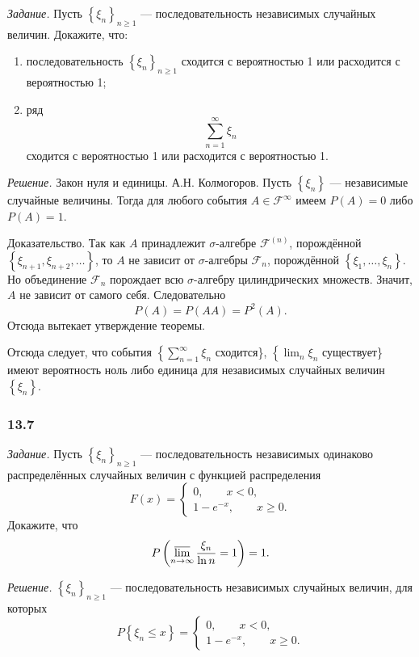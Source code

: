 \textit{Задание.} Пусть $ \left\{ \xi_n \right\}_{n \geq 1}$ --- последовательность независимых случайных величин.
Докажите, что:
\begin{enumerate}[label=\alph*)]
\item последовательность $ \left\{ \xi_n \right\}_{n \geq 1}$ сходится с вероятностью 1 или расходится с вероятностью 1;
\item ряд
$$ \sum \limits_{n=1}^{ \infty } \xi_n$$
сходится с вероятностью 1 или расходится с вероятностью 1.
\end{enumerate}

\textit{Решение.} Закон нуля и единицы.
А.Н. Колмогоров.
Пусть $ \left\{ \xi_n \right\} $ --- независимые случайные величины.
Тогда для любого события $A \in \mathcal{F}^{ \infty }$ имеем $P \left( A \right) = 0$ либо $P \left( A \right) = 1$.

Доказательство.
Так как $A$ принадлежит $ \sigma $-алгебре $ \mathcal{F}^{ \left( n \right) }$,
порождённой $ \left\{ \xi_{n+1}, \xi_{n+2}, \dotsc \right\} $,
то $A$ не зависит от $ \sigma $-алгебры $ \mathcal{F}_n$, порождённой $ \left\{ \xi_1, \dotsc, \xi_n \right\} $.
Но объединение $ \mathcal{F}_n$ порождает всю $ \sigma $-алгебру цилиндрических множеств.
Значит, $A$ не зависит от самого себя.
Следовательно
$$P \left( A \right) =
P \left( AA \right) =
P^2 \left( A \right).$$
Отсюда вытекает утверждение теоремы.

Отсюда следует,
что события $ \left\{ \sum_{n=1}^{ \infty } \xi_n \right.$ сходится\},
$ \left\{ \lim_{n} \xi_n \right.$ существует\} имеют вероятность ноль либо единица для независимых случайных величин $ \left\{ \xi_n \right\} $.

\subsubsection*{13.7}

\textit{Задание.} Пусть $ \left\{ \xi_n \right\}_{n \geq 1}$ --- последовательность независимых одинаково распределённых случайных величин с функцией распределения
$$F \left( x \right) =
\begin{cases}
0, \qquad x < 0, \\
1 - e^{-x}, \qquad x \geq 0.
\end{cases}$$
Докажите, что
$$P \left( \varlimsup \limits_{n \to \infty } \frac{ \xi_n}{ \ln n} = 1 \right) =
1.$$

\textit{Решение.} $ \left\{ \xi_n \right\}_{n \geq 1}$ --- последовательность независимых случайных величин, для которых
$$P \left\{ \xi_n \leq x \right\} =
\begin{cases}
0, \qquad x < 0, \\
1 - e^{-x}, \qquad x \geq 0.
\end{cases}$$

